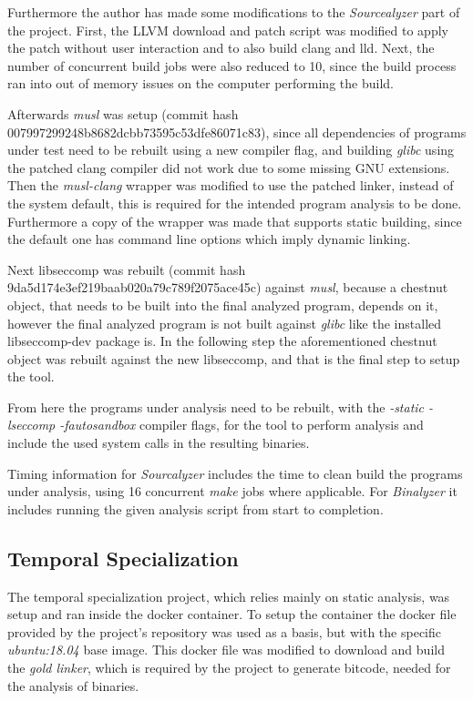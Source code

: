 Furthermore the author has made some modifications to the \textit{Sourcealyzer} part of the project. First, the LLVM download and patch script was modified to apply the patch without user interaction and to also build clang and lld.
Next, the number of concurrent build jobs were also reduced to 10, since the build process ran into out of memory issues on the computer performing the build.

Afterwards \textit{musl} was setup (commit hash 007997299248b8682dcbb73595c53dfe86071c83), since all dependencies of programs under test need to be rebuilt using a new compiler flag, and building \textit{glibc} using the patched clang compiler did not work due to some missing GNU extensions.
Then the \textit{musl-clang} wrapper was modified to use the patched linker, instead of the system default, this is required for the intended program analysis to be done.
Furthermore a copy of the wrapper was made that supports static building, since the default one has command line options which imply dynamic linking.

Next libseccomp was rebuilt (commit hash 9da5d174e3ef219baab020a79c789f2075ace45c) against \textit{musl}, because a chestnut object, that needs to be built into the final analyzed program, depends on it, however the final analyzed program is not built against \textit{glibc} like the installed libseccomp-dev package is.
In the following step the aforementioned chestnut object was rebuilt against the new libseccomp, and that is the final step to setup the tool.

From here the programs under analysis need to be rebuilt, with the \textit{-static -lseccomp -fautosandbox} compiler flags, for the tool to perform analysis and include the used system calls in the resulting binaries.

Timing information for \textit{Sourcalyzer} includes the time to clean build the programs under analysis, using 16 concurrent \textit{make} jobs where applicable. For \textit{Binalyzer} it includes running the given analysis script from start to completion.

\subsection {Temporal Specialization}
The temporal specialization \cite{ref_mp_1} project, which relies mainly on static analysis, was setup and ran inside the docker container.
To setup the container the docker file provided by the project's repository was used as a basis, but with the specific \textit{ubuntu:18.04} base image.
This docker file was modified to download and build the \textit{gold linker}, which is required by the project to generate bitcode, needed for the analysis of binaries.

